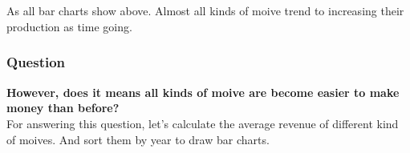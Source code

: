 \documentclass[11pt]{article}
\begin{document}
    \begin{center}
    \end{center}
    { \hspace*{\fill} \\}
    
    \begin{center}
    \end{center}
    { \hspace*{\fill} \\}
    
    \begin{center}
    \end{center}
    { \hspace*{\fill} \\}
    
    \begin{center}
    \end{center}
    { \hspace*{\fill} \\}
    
    As all bar charts show above. Almost all kinds of moive trend to
increasing their production as time going.

\subsubsection{Question}\label{question}

\textbf{However, does it means all kinds of moive are become easier to
make money than before?}
\\
For answering this question, let's calculate the average revenue of
different kind of moives. And sort them by year to draw bar charts.
\end{document}
